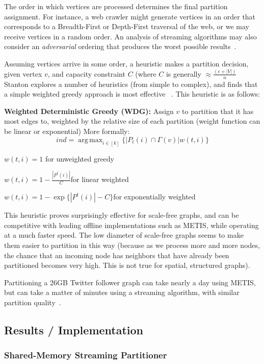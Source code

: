 \documentclass[11pt]{article}
\DeclareMathOperator*{\argmax}{arg\,max}
\begin{document}
The order in which vertices are processed determines the final partition assignment. For instance, a web crawler might generate vertices in an order that corresponds to a Breadth-First or Depth-First traversal of the web, or we may receive vertices in a random order. An analysis of streaming algorithms may also consider an \textit{adversarial} ordering that produces the worst possible results~\cite{Stanton:2012:SGP:2339530.2339722}.

Assuming vertices arrive in some order, a heuristic makes a partition decision, given vertex $v$, and capacity constraint $C$ (where $C$ is generally $\approx \frac{(\epsilon+|V|)}{n}$ Stanton explores a number of heuristics (from simple to complex), and finds that a simple weighted greedy approach is most effective ~\cite{Stanton:2012:SGP:2339530.2339722}. This heuristic is as follows:

\textbf{Weighted Deterministic Greedy (WDG):} Assign $v$ to partition that it has most edges to, weighted by the relative size of each partition (weight function can be linear or exponential) More formally: 
\[ ind=\argmax_{i\in [k]}\{|P_t(i) \cap \Gamma(v) | w(t,i)\} \]

$w(t,i)=1$ for unweighted greedy

$w(t,i)=1-\frac{|P^t(i)|}{C} $for linear weighted

$w(t,i)=1-\exp\{|P^t(i)|-C\} $for exponentially weighted

This heuristic proves surprisingly effective for scale-free graphs, and can be competitive with leading offline implementations such as METIS, while operating at a much faster speed. The low diameter of scale-free graphs seems to make them easier to partition in this way (because as we process more and more nodes, the chance that an incoming node has neighbors that have already been partitioned becomes very high. This is not true for spatial, structured graphs). 

Partitioning a 26GB Twitter follower graph can take nearly a day using METIS, but can take a matter of minutes using a streaming algorithm, with similar partition quality~\cite{tsourakakis2012fennel}. 

\subsection{Results / Implementation}
\subsubsection{Shared-Memory Streaming Partitioner}
\end{document}
